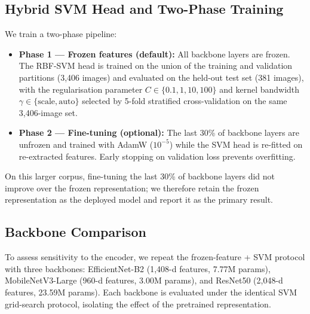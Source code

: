 \documentclass{IEEEtran}
\begin{document}
\subsection{Hybrid SVM Head and Two-Phase Training}
We train a two-phase pipeline:
\begin{itemize}
    \item \textbf{Phase 1 --- Frozen features (default):} All backbone layers are frozen. The RBF-SVM head is trained on the union of the training and validation partitions (3,406 images) and evaluated on the held-out test set (381 images), with the regularisation parameter $C\in\{0.1,1,10,100\}$ and kernel bandwidth $\gamma\in\{\text{scale},\text{auto}\}$ selected by 5-fold stratified cross-validation on the same 3,406-image set.
\item \textbf{Phase 2 --- Fine-tuning (optional):} The last 30\% of backbone layers are unfrozen and trained with AdamW ($10^{-5}$) while the SVM head is re-fitted on re-extracted features. Early stopping on validation loss prevents overfitting.
\end{itemize}
On this larger corpus, fine-tuning the last 30\% of backbone layers did not improve over the frozen representation; we therefore retain the frozen representation as the deployed model and report it as the primary result.

\subsection{Backbone Comparison}
To assess sensitivity to the encoder, we repeat the frozen-feature + SVM protocol with three backbones: EfficientNet-B2 (1,408-d features, 7.77M params), MobileNetV3-Large (960-d features, 3.00M params), and ResNet50 (2,048-d features, 23.59M params). Each backbone is evaluated under the identical SVM grid-search protocol, isolating the effect of the pretrained representation.
\end{document}
